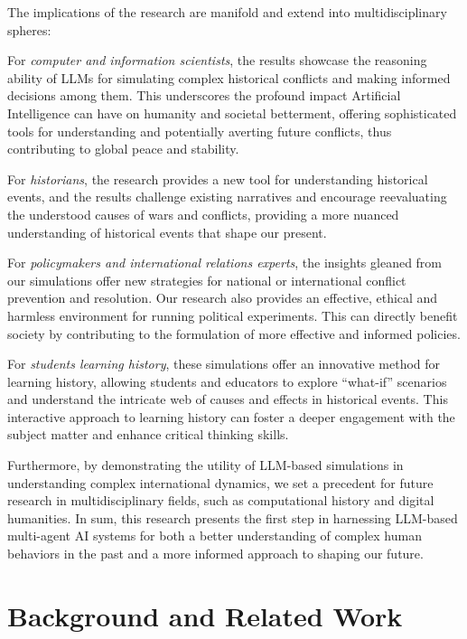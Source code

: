 \documentclass{article}
\begin{document}
The implications of the research are manifold and extend into multidisciplinary spheres:
\par For \textit{computer and information scientists}, the results showcase the reasoning ability of LLMs for simulating complex historical conflicts and making informed decisions among them. This underscores the profound impact Artificial Intelligence can have on humanity and societal betterment, offering sophisticated tools for understanding and potentially averting future conflicts, thus contributing to global peace and stability.
\par For \textit{historians}, the research provides a new tool for understanding historical events, and the results challenge existing narratives and encourage reevaluating the understood causes of wars and conflicts, providing a more nuanced understanding of historical events that shape our present. 
\par For \textit{policymakers and international relations experts}, the insights gleaned from our simulations offer new strategies for national or international conflict prevention and resolution. Our research also provides an effective, ethical and harmless environment for running political experiments. This can directly benefit society by contributing to the formulation of more effective and informed policies. 
\par For \textit{students learning history}, these simulations offer an innovative method for learning history, allowing students and educators to explore ``what-if'' scenarios and understand the intricate web of causes and effects in historical events. This interactive approach to learning history can foster a deeper engagement with the subject matter and enhance critical thinking skills. 

Furthermore, by demonstrating the utility of LLM-based simulations in understanding complex international dynamics, we set a precedent for future research in multidisciplinary fields, such as computational history and digital humanities. 
In sum, this research presents the first step in harnessing LLM-based multi-agent AI systems for both a better understanding of complex human behaviors in the past and a more informed approach to shaping our future.

\section{Background and Related Work}
\end{document}
